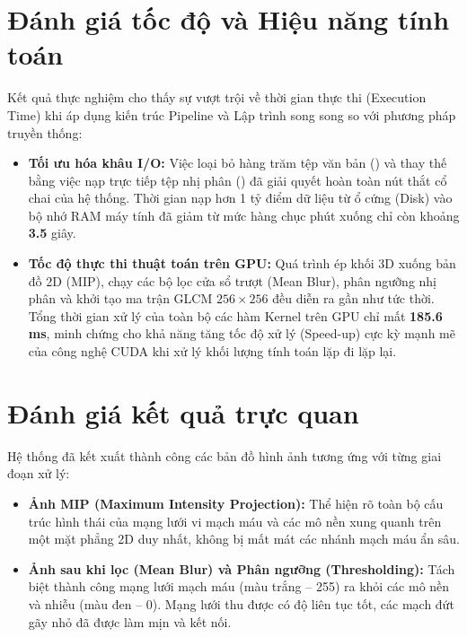 \section{Đánh giá tốc độ và Hiệu năng tính toán}

Kết quả thực nghiệm cho thấy sự vượt trội về thời gian thực thi (Execution Time) khi áp dụng kiến trúc Pipeline và Lập trình song song so với phương pháp truyền thống:

\begin{itemize}
    \item \textbf{Tối ưu hóa khâu I/O:} Việc loại bỏ hàng trăm tệp văn bản () và thay thế bằng việc nạp trực tiếp tệp nhị phân () đã giải quyết hoàn toàn nút thắt cổ chai của hệ thống. Thời gian nạp hơn 1 tỷ điểm dữ liệu từ ổ cứng (Disk) vào bộ nhớ RAM máy tính đã giảm từ mức hàng chục phút xuống chỉ còn khoảng \textbf{3.5} giây.
    
    \item \textbf{Tốc độ thực thi thuật toán trên GPU:} Quá trình ép khối 3D xuống bản đồ 2D (MIP), chạy các bộ lọc cửa sổ trượt (Mean Blur), phân ngưỡng nhị phân và khởi tạo ma trận GLCM $256 \times 256$ đều diễn ra gần như tức thời. Tổng thời gian xử lý của toàn bộ các hàm Kernel trên GPU chỉ mất \textbf{185.6 ms}, minh chứng cho khả năng tăng tốc độ xử lý (Speed-up) cực kỳ mạnh mẽ của công nghệ CUDA khi xử lý khối lượng tính toán lặp đi lặp lại.
\end{itemize}


\section{Đánh giá kết quả trực quan }

Hệ thống đã kết xuất thành công các bản đồ hình ảnh tương ứng với từng giai đoạn xử lý:

\begin{itemize}
    \item \textbf{Ảnh MIP (Maximum Intensity Projection):} Thể hiện rõ toàn bộ cấu trúc hình thái của mạng lưới vi mạch máu và các mô nền xung quanh trên một mặt phẳng 2D duy nhất, không bị mất mát các nhánh mạch máu ẩn sâu.
    
    \item \textbf{Ảnh sau khi lọc (Mean Blur) và Phân ngưỡng (Thresholding):} Tách biệt thành công mạng lưới mạch máu (màu trắng -- 255) ra khỏi các mô nền và nhiễu (màu đen -- 0). Mạng lưới thu được có độ liên tục tốt, các mạch đứt gãy nhỏ đã được làm mịn và kết nối.
\end{itemize}

